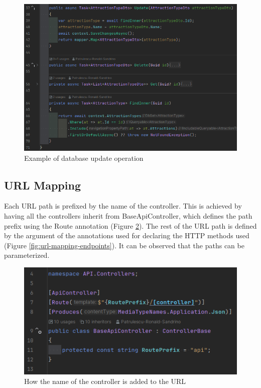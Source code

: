 \begin{figure}[!ht]
    \centering
    \includegraphics[width=1\linewidth]{4.3.3_database-write-update.png}
    \caption{Example of database update operation}
    \label{fig:database-write-update}
\end{figure}

\subsection{URL Mapping}

\par Each URL path is prefixed by the name of the controller. This is achieved by having all the controllers inherit from BaseApiController, which defines the path prefix using the Route annotation (Figure \ref{fig:url-mapping-baseapicontroller}). The rest of the URL path is defined by the argument of the annotations used for declaring the HTTP methods used (Figure \ref{fig:url-mapping-endpoints}). It can be observed that the paths can be parameterized.


\begin{figure}[!ht]
    \centering
    \includegraphics[width=1\linewidth]{4.3.4_url-mapping-baseapicontroller.png}
    \caption{How the name of the controller is added to the URL}
    \label{fig:url-mapping-baseapicontroller}
\end{figure}

